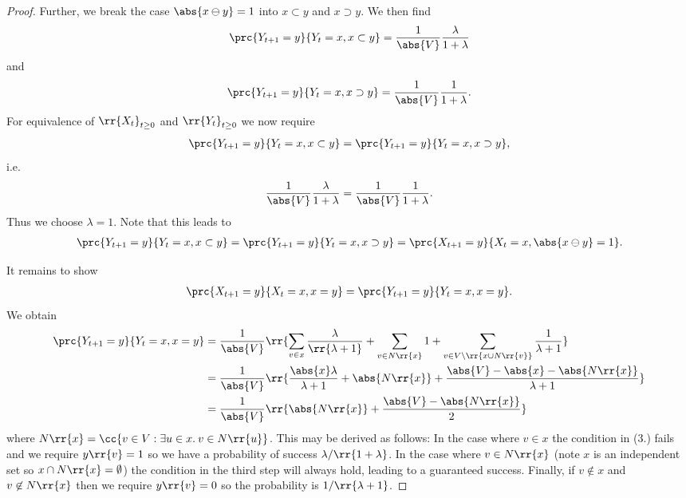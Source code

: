 \documentclass{article}
\begin{document}
\begin{claim*}[1]
\begin{proof}
    Further, we break the case $\abs{x\ominus y}=1$
    into $x\subset y$ and $x\supset y$. We then find
    \begin{align*}
      \prc{Y_{t+1}=y}{Y_t=x, x\subset y} = \frac{1}{\abs{V}} \frac{\lambda}{1+\lambda}
    \end{align*}
    and
    \begin{align*}
      \prc{Y_{t+1}=y}{Y_t=x, x\supset y} = \frac{1}{\abs{V}} \frac{1}{1+\lambda}.
    \end{align*}
    For equivalence of $\rr{X_t}_{t\geq 0}$ and $\rr{Y_t}_{t\geq 0}$ we now require
    \begin{align*}
      \prc{Y_{t+1}=y}{Y_t=x, x\subset y} = \prc{Y_{t+1}=y}{Y_t=x, x\supset y},
    \end{align*}
    i.e.
    \begin{align*}
      \frac{1}{\abs{V}} \frac{\lambda}{1+\lambda} = \frac{1}{\abs{V}} \frac{1}{1+\lambda}.
    \end{align*}
    Thus we choose $\lambda = 1$. Note that this leads to
    \begin{align*}
      \prc{Y_{t+1}=y}{Y_t=x, x\subset y} = \prc{Y_{t+1}=y}{Y_t=x, x\supset y}=\prc{X_{t+1}=y}{X_t=x, \abs{x\ominus y}=1}.
    \end{align*}

    It remains to show
    \begin{align}
      \label{eq:equal-case}
      \prc{X_{t+1}=y}{X_t=x, x=y}= \prc{Y_{t+1}=y}{Y_t=x, x=y}.
    \end{align}
    We obtain
    \begin{align*}
      \prc{Y_{t+1}=y}{Y_t=x, x=y}
      &= \frac{1}{\abs{V}} \rr{\sum_{v\in x} \frac{\lambda}{\rr{\lambda + 1}} + \sum_{v\in N\rr{x}} 1 + \sum_{v\in V\setminus\rr{x\cup N\rr{v}}} \frac{1}{\lambda+1}} \\
      &= \frac{1}{\abs{V}} \rr{\frac{\abs{x}\lambda}{\lambda + 1} + \abs{N\rr{x}} + \frac{\abs{V}-\abs{x}-\abs{N\rr{x}}}{\lambda + 1}} \\
      &= \frac{1}{\abs{V}} \rr{\abs{N\rr{x}} + \frac{\abs{V}-\abs{N\rr{x}}}{2}}
    \end{align*}
    where $N\rr{x}=\cc{v \in V : \exists u\in x. \: v\in N\rr{u}}$. This may be derived as follows:
    In the case where $v\in x$ the condition in (3.) fails and we require $y\rr{v}=1$ so we have
    a probability of success $\lambda/\rr{1+\lambda}$. In the case where $v\in N\rr{x}$ (note $x$
    is an independent set so $x\cap N\rr{x}=\emptyset$) the condition in the third step will
    always hold, leading to a guaranteed success. Finally, if $v\not\in x$ and $v\not\in N\rr{x}$
    then we require $y\rr{v}=0$ so the probability is $1/\rr{\lambda + 1}$.
    

\end{proof}
\end{claim*}
\end{document}
